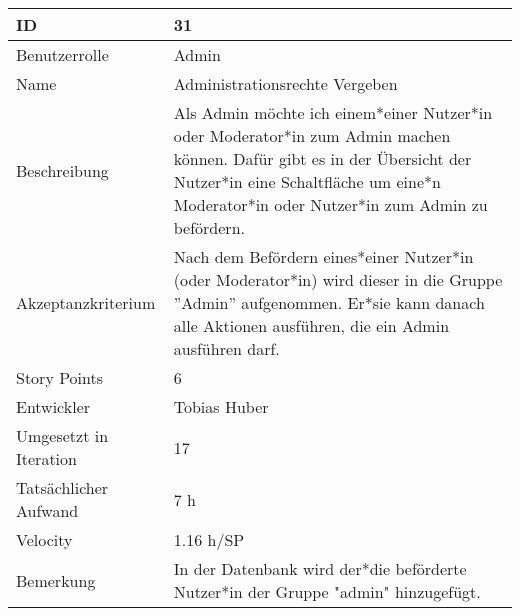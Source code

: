 \begin{tabularx}{\textwidth}{|p{}|X|}
	\hline
	ID & 31 \\
	\hline
	Benutzerrolle & Admin \\
	\hline
	Name & Administrationsrechte Vergeben\\
	\hline
	Beschreibung & Als Admin möchte ich einem*einer Nutzer*in oder Moderator*in zum Admin machen können. Dafür gibt es in der Übersicht der Nutzer*in eine Schaltfläche um eine*n Moderator*in oder Nutzer*in zum Admin zu befördern.  \\
	\hline
	Akzeptanzkriterium & Nach dem Befördern eines*einer Nutzer*in (oder Moderator*in) wird dieser in die Gruppe ''Admin'' aufgenommen. Er*sie kann danach alle Aktionen ausführen, die ein Admin ausführen darf. \\
	\hline
	Story Points & 6 \\
	\hline
	Entwickler &  Tobias Huber\\
	\hline
	Umgesetzt in Iteration & 17\\
	\hline
	Tatsächlicher Aufwand & 7 h\\
	\hline
	Velocity & 1.16 h/SP\\
	\hline
	Bemerkung & In der Datenbank wird der*die beförderte Nutzer*in der Gruppe "admin" hinzugefügt. \\
	\hline
\end{tabularx}
\vspace{20pt}
